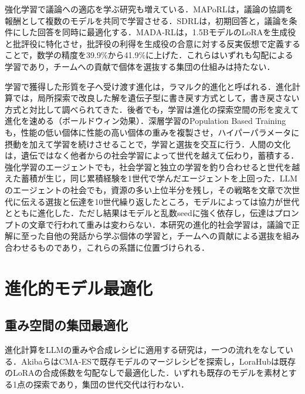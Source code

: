 強化学習で議論への適応を学ぶ研究も増えている．MAPoRL\cite{park2025maporl}は，議論の協調を報酬として複数のモデルを共同で学習させる．SDRL\cite{liu2026sdrl}は，初期回答と，議論を条件にした回答を同時に最適化する．MADA-RL\cite{pulici2026madarl}は，1.5BモデルのLoRAを生成役と批評役に特化させ，批評役の利得を生成役の合意に対する反実仮想で定義することで，数学の精度を39.9\%から41.9\%に上げた．これらはいずれも勾配による学習であり，チームへの貢献で個体を選抜する集団の仕組みは持たない．

学習で獲得した形質を子へ受け渡す進化は，ラマルク的進化と呼ばれる．進化計算では，局所探索で改良した解を遺伝子型に書き戻す方式として，書き戻さない方式と対比して調べられてきた\cite{whitley1994lamarckian}．後者でも，学習は進化の探索空間の形を変えて進化を速める（ボールドウィン効果\cite{hinton1987learning}）．深層学習のPopulation Based Training\cite{jaderberg2017population}も，性能の低い個体に性能の高い個体の重みを複製させ，ハイパーパラメータに摂動を加えて学習を続けさせることで，学習と選抜を交互に行う．人間の文化は，遺伝ではなく他者からの社会学習によって世代を越えて伝わり，蓄積する\cite{boyd1985culture}．強化学習のエージェントでも，社会学習と独立の学習を釣り合わせると世代を越えた蓄積が生じ，同じ累積経験を1世代で学んだエージェントを上回った\cite{cook2024generational}．LLMのエージェントの社会でも，資源の多い上位半分を残し，その戦略を文章で次世代に伝える選抜と伝達を10世代繰り返したところ，モデルによっては協力が世代とともに進化した．ただし結果はモデルと乱数seedに強く依存し，伝達はプロンプトの文章で行われて重みは変わらない\cite{vallinder2025cultural}．本研究の進化的社会学習は，議論で正解に至った自他の発話から学ぶ個体の学習と，チームへの貢献による選抜を組み合わせるものであり，これらの系譜に位置づけられる．

\section{進化的モデル最適化}
\label{sec:2.4}

\subsection{重み空間の集団最適化}
\label{sec:2.4.1}

進化計算をLLMの重みや合成レシピに適用する研究は，一つの流れをなしている．Akibaら\cite{akiba2024evolutionary}はCMA-ESで既存モデルのマージレシピを探索し，LoraHub\cite{huang2023lorahub}は既存のLoRAの合成係数を勾配なしで最適化した．いずれも既存のモデルを素材とする1点の探索であり，集団の世代交代は行わない．


